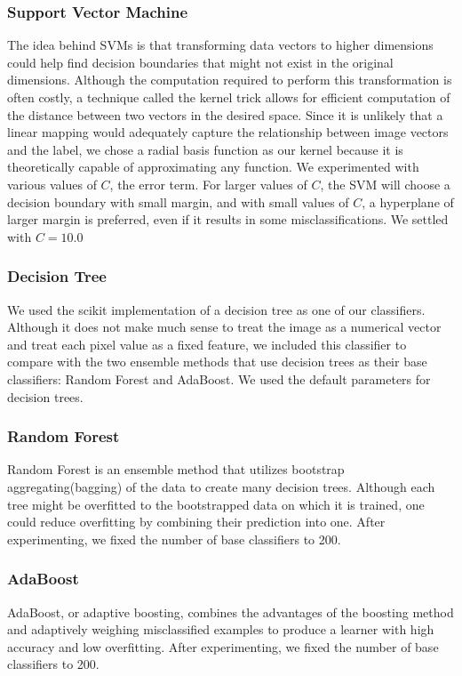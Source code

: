 \documentclass[11pt]{article}
\begin{document}
	\subsubsection{Support Vector Machine}
	The idea behind SVMs is that transforming data vectors to higher dimensions could help find decision boundaries that might not exist in the original dimensions. Although the computation required to perform this transformation is often costly, a technique called the kernel trick allows for efficient computation of the distance between two vectors in the desired space. Since it is unlikely that a linear mapping would adequately capture the relationship between image vectors and the label, we chose a radial basis function as our kernel because it is theoretically capable of approximating any function. We experimented with various values of $C$, the error term. For larger values of $C$, the SVM will choose a decision boundary with small margin, and with small values of $C$, a hyperplane of larger margin is preferred, even if it results in some misclassifications. We settled with $C=10.0$
	
	\subsubsection{Decision Tree}
	We used the scikit implementation of a decision tree as one of our classifiers. Although it does not make much sense to treat the image as a numerical vector and treat each pixel value as a fixed feature, we included this classifier to compare with the two ensemble methods that use decision trees as their base classifiers: Random Forest and AdaBoost. We used the default parameters for decision trees.
	
	\subsubsection{Random Forest}
	Random Forest is an ensemble method that utilizes bootstrap aggregating(bagging) of the data to create many decision trees. Although each tree might be overfitted to the bootstrapped data on which it is trained, one could reduce overfitting by combining their prediction into one. After experimenting, we fixed the number of base classifiers to 200.
	
	\subsubsection{AdaBoost}
	AdaBoost, or adaptive boosting, combines the advantages of the boosting method and adaptively weighing misclassified examples to produce a learner with high accuracy and low overfitting. After experimenting, we fixed the number of base classifiers to 200.
	
\end{document}
